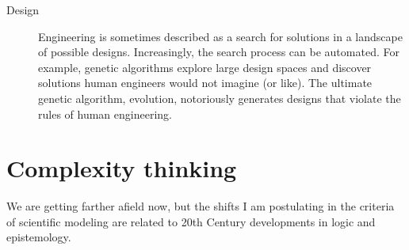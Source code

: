 \documentclass[12pt]{book}
\theoremstyle{exercise}
\newcommand{\myrightarrow}{\ensuremath \rightarrow}
\begin{document}
\begin{description}

\item[Design \myrightarrow~search] Engineering is sometimes described
  as a search for solutions in a landscape of possible designs.
  Increasingly, the search process can be automated.  For example,
  genetic algorithms explore large design spaces and discover
  solutions human engineers would not imagine (or like).  The ultimate
  genetic algorithm, evolution, notoriously generates designs that
  violate the rules of human engineering.


\end{description}


\section{Complexity thinking}

We are getting farther afield now, but the shifts I am postulating
in the criteria of scientific modeling are related to 20th Century
developments in logic and epistemology.

\end{document}
